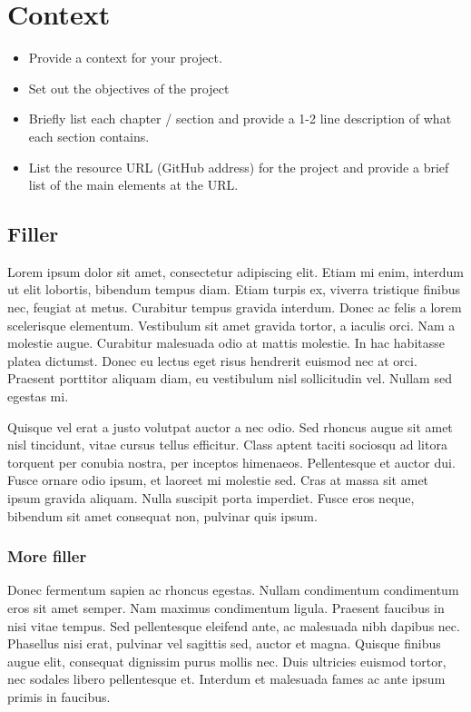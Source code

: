 \chapter{Context}
\begin{itemize}
\item Provide a context for your project.
\item Set out the objectives of the project
\item Briefly list each chapter / section and provide a 1-2 line description of what each section contains.
\item List the resource URL (GitHub address) for the project and provide a brief list of the main elements at the URL.
\end{itemize}

\section{Filler}
Lorem ipsum dolor sit amet, consectetur adipiscing elit. Etiam mi enim, interdum ut elit lobortis, bibendum tempus diam. Etiam turpis ex, viverra tristique finibus nec, feugiat at metus. Curabitur tempus gravida interdum. Donec ac felis a lorem scelerisque elementum. Vestibulum sit amet gravida tortor, a iaculis orci. Nam a molestie augue. Curabitur malesuada odio at mattis molestie. In hac habitasse platea dictumst. Donec eu lectus eget risus hendrerit euismod nec at orci. Praesent porttitor aliquam diam, eu vestibulum nisl sollicitudin vel. Nullam sed egestas mi.

Quisque vel erat a justo volutpat auctor a nec odio. Sed rhoncus augue sit amet nisl tincidunt, vitae cursus tellus efficitur. Class aptent taciti sociosqu ad litora torquent per conubia nostra, per inceptos himenaeos. Pellentesque et auctor dui. Fusce ornare odio ipsum, et laoreet mi molestie sed. Cras at massa sit amet ipsum gravida aliquam. Nulla suscipit porta imperdiet. Fusce eros neque, bibendum sit amet consequat non, pulvinar quis ipsum.

\subsection{More filler}
Donec fermentum sapien ac rhoncus egestas. Nullam condimentum condimentum eros sit amet semper. Nam maximus condimentum ligula. Praesent faucibus in nisi vitae tempus. Sed pellentesque eleifend ante, ac malesuada nibh dapibus nec. Phasellus nisi erat, pulvinar vel sagittis sed, auctor et magna. Quisque finibus augue elit, consequat dignissim purus mollis nec. Duis ultricies euismod tortor, nec sodales libero pellentesque et. Interdum et malesuada fames ac ante ipsum primis in faucibus.

